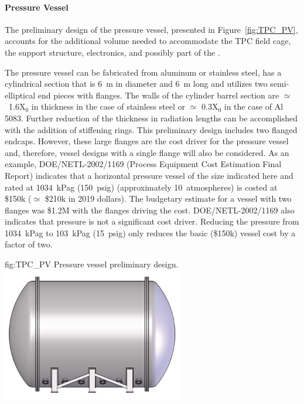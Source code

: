 \paragraph{ Pressure Vessel}\label{sec:TPC_PV}

The preliminary design of the pressure vessel, presented in Figure~\ref{fig:TPC_PV}, accounts for the additional volume needed to accommodate the TPC field cage, the  support structure,  electronics, and possibly part of the .

The pressure vessel can be fabricated from aluminum or stainless steel, has a cylindrical section that is 6~m in diameter and \SI{6}{m} long and utilizes two semi-elliptical end pieces with flanges. The walls of the cylinder barrel section are $\simeq$~1.6X$_0$ in thickness in the case of stainless steel or $\simeq$ 0.3X$_0$ in the case of Al 5083.  Further reduction of the thickness in radiation lengths can be accomplished  with the addition of stiffening rings.   This preliminary design includes two flanged endcaps.  However, these large flanges are the cost driver for the pressure vessel and, therefore, vessel designs with a single flange will also be considered.  As an example, DOE/NETL-2002/1169 (Process Equipment Cost Estimation
Final Report) indicates that a horizontal pressure vessel of the size indicated here and rated at \SI{1034}{kPag} (\SI{150}{psig}) (approximately 10~atmospheres) is costed at \$150k ($\simeq$ \$210k in 2019 dollars).  The budgetary estimate for a vessel with two flanges was \$1.2M with the flanges driving the cost.  DOE/NETL-2002/1169 also indicates that pressure is not a significant cost driver.  Reducing the pressure from \SI{1034}{kPag} to \SI{103}{kPag} (\SI{15}{psig}) only reduces the basic (\$150k) vessel cost by a factor of two.


\begin{dunefigure}{fig:TPC_PV}
{Pressure vessel preliminary design.}
\includegraphics[width=0.6\textwidth]{graphics/tpc_pressurevessel.png}
\end{dunefigure}

